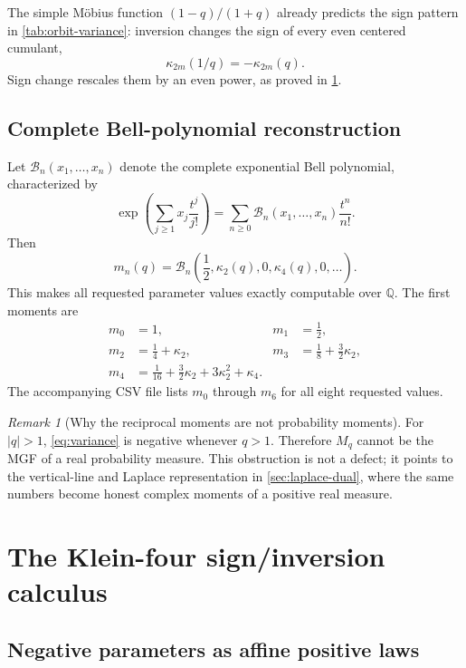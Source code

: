 \documentclass[11pt,oneside]{article}
\numberwithin{equation}{section}
\theoremstyle{definition}
\theoremstyle{remark}
\newtheorem{remark}[theorem]{Remark}
\newcommand{\Q}{\mathbb Q}
\newcommand{\Bell}{\mathcal B}
\begin{document}
The simple Möbius function $(1-q)/(1+q)$ already predicts the sign pattern in
\cref{tab:orbit-variance}: inversion changes the sign of every even centered
cumulant,
\begin{equation}
 \kappa_{2m}(1/q)=-\kappa_{2m}(q).
 \label{eq:cumulant-inversion}
\end{equation}
Sign change rescales them by an even power, as proved in
\cref{sec:klein-four}.

\subsection{Complete Bell-polynomial reconstruction}

Let $\Bell_n(x_1,\ldots,x_n)$ denote the complete exponential Bell polynomial,
characterized by
\[
 \exp\!\left(\sum_{j\ge1}x_j\frac{t^j}{j!}\right)
 =\sum_{n\ge0}\Bell_n(x_1,\ldots,x_n)\frac{t^n}{n!}.
\]
Then
\begin{equation}
 \boxed{
 m_n(q)=\Bell_n\left(
 \frac12,\kappa_2(q),0,\kappa_4(q),0,\ldots
 \right).}
 \label{eq:Bell-moments}
\end{equation}
This makes all requested parameter values exactly computable over $\Q$.  The
first moments are
\begin{align}
 m_0&=1,
 &m_1&=\frac12,\nonumber\\
 m_2&=\frac14+\kappa_2,
 &m_3&=\frac18+\frac32\kappa_2,\nonumber\\
 m_4&=\frac1{16}+\frac32\kappa_2+3\kappa_2^2+\kappa_4.
 \label{eq:first-moments-cumulants}
\end{align}
The accompanying CSV file  lists $m_0$ through
$m_6$ for all eight requested values.

\begin{remark}[Why the reciprocal moments are not probability moments]
For $|q|>1$, \eqref{eq:variance} is negative whenever $q>1$.  Therefore
$M_q$ cannot be the MGF of a real probability measure.  This obstruction is
not a defect; it points to the vertical-line and Laplace representation in
\cref{sec:laplace-dual}, where the same numbers become honest complex moments
of a positive real measure.
\end{remark}

\section{The Klein-four sign/inversion calculus}
\label{sec:klein-four}

\subsection{Negative parameters as affine positive laws}
\end{document}
